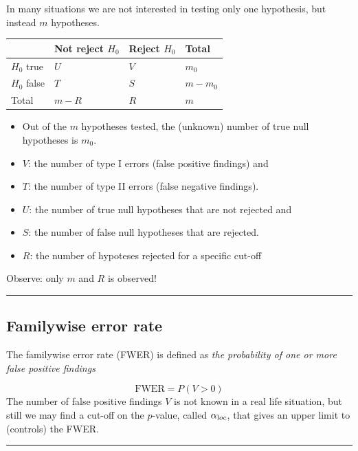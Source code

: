 \documentclass[
  letterpaper,
  DIV=11,
  numbers=noendperiod]{scrartcl}
\providecommand{\tightlist}{%
  \setlength{\itemsep}{0pt}\setlength{\parskip}{0pt}}\usepackage{longtable,booktabs,array}
\begin{document}
In many situations we are not interested in testing only one hypothesis,
but instead \(m\) hypotheses.

\begin{longtable}[]{@{}llll@{}}
\toprule()
& Not reject \(H_0\) & Reject \(H_0\) & Total \\
\midrule()
\endhead
\(H_0\) true & \(U\) & \(V\) & \(m_0\) \\
\(H_0\) false & \(T\) & \(S\) & \(m - m_0\) \\
Total & \(m-R\) & \(R\) & \(m\) \\
\bottomrule()
\end{longtable}

\begin{itemize}
\tightlist
\item
  Out of the \(m\) hypotheses tested, the (unknown) number of true null
  hypotheses is \(m_0\).
\item
  \(V\): the number of type I errors (false positive findings) and
\item
  \(T\): the number of type II errors (false negative findings).
\item
  \(U\): the number of true null hypotheses that are not rejected and
\item
  \(S\): the number of false null hypotheses that are rejected.
\item
  \(R\): the number of hypoteses rejected for a specific cut-off
\end{itemize}

Observe: only \(m\) and \(R\) is observed!

\begin{center}\rule{0.5\linewidth}{0.5pt}\end{center}

\hypertarget{familywise-error-rate}{%
\subsection{Familywise error rate}\label{familywise-error-rate}}

The familywise error rate (FWER) is defined as \emph{the probability of
one or more false positive findings}

\[ \text{FWER} = P(V > 0) \] The number of false positive findings \(V\)
is not known in a real life situation, but still we may find a cut-off
on the \(p\)-value, called \(\alpha_{\text loc}\), that gives an upper
limit to (controls) the FWER.

\begin{center}\rule{0.5\linewidth}{0.5pt}\end{center}
\end{document}
